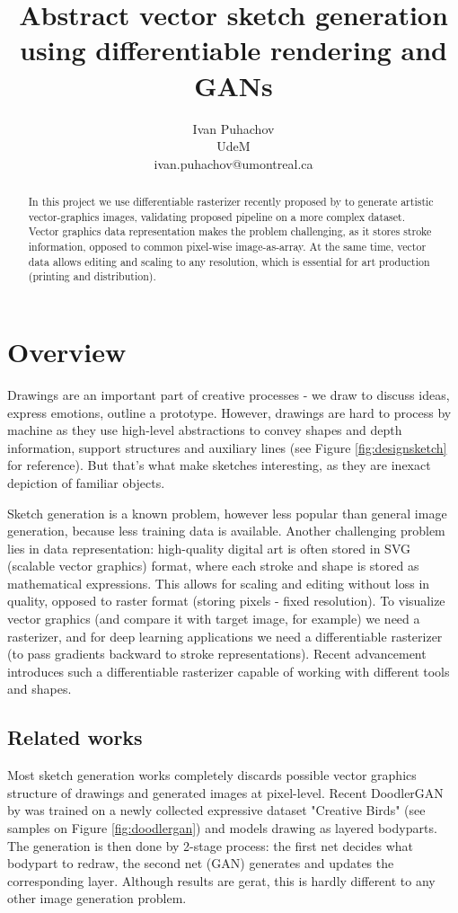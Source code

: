 \documentclass{article}
\title{Abstract vector sketch generation using differentiable rendering and GANs}
\author{
   Ivan Puhachov \\ 
   UdeM \\
   ivan.puhachov@umontreal.ca \\
}
\begin{document}
\maketitle

\begin{abstract}
  In this project we use differentiable rasterizer recently proposed by \cite{diffsvg} to generate artistic vector-graphics images, validating proposed pipeline on a more complex dataset. Vector graphics data representation makes the problem challenging, as it stores stroke information, opposed to common pixel-wise image-as-array.  At the same time, vector data allows editing and scaling to any resolution, which is essential for art production (printing and distribution).
\end{abstract}

\section{Overview}
Drawings are an important part of creative processes - we draw to discuss ideas, express emotions, outline a prototype. However, drawings are hard to process by machine as they use high-level abstractions to convey shapes and depth information, support structures and auxiliary lines (see Figure \ref{fig:designsketch} for reference). But that's what make sketches interesting, as they are inexact depiction of familiar objects.

Sketch generation is a known problem, however less popular than general image generation, because less training data is available. Another challenging problem lies in data representation: high-quality digital art is often stored in SVG (scalable vector graphics) format, where each stroke and shape is stored as mathematical expressions. This allows for scaling and editing without loss in quality, opposed to raster format (storing pixels - fixed resolution). To visualize vector graphics (and compare it with target image, for example) we need a rasterizer, and for deep learning applications we need a differentiable rasterizer (to pass gradients backward to stroke representations). Recent advancement  \cite{diffsvg} introduces such a differentiable rasterizer capable of working with different tools and shapes.

\subsection{Related works}

Most sketch generation works completely discards possible vector graphics structure of drawings and generated images at pixel-level. Recent DoodlerGAN by \cite{doodlergan} was trained on a newly collected expressive dataset "Creative Birds" (see samples on Figure \ref{fig:doodlergan}) and models drawing as layered bodyparts. The generation is then done by 2-stage process: the first net decides what bodypart to redraw, the second net (GAN) generates and updates the corresponding layer. Although results are gerat, this is hardly different to any other image generation problem. 
\end{document}
